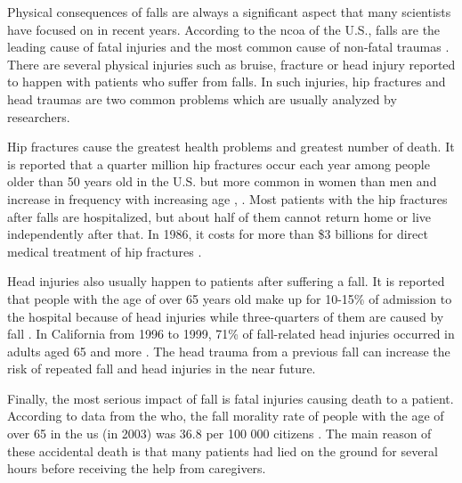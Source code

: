 \documentclass[letterpaper,12pt,titlepage,oneside,final]{book}
\begin{document}
Physical consequences of falls are always a significant aspect that many scientists have focused on in recent years. According to the \gls{ncoa} of the U.S., falls are the leading cause of fatal injuries and the most common cause of non-fatal traumas \cite{ncoa}. There are several physical injuries such as bruise, fracture or head injury reported to happen with patients who suffer from falls. In such injuries, hip fractures and head traumas are two common problems which are usually analyzed by researchers. \par
Hip fractures cause the greatest health problems and greatest number of death. It is reported that a quarter million hip fractures occur each year among people older than 50 years old in the U.S. but more common in women than men and increase in frequency with increasing age \cite{bibli_book}, \cite{medicinenet_fracture}. Most patients with the hip fractures after falls are hospitalized, but about half of them cannot return home or live independently after that. In 1986, it costs for more than \$3 billions for direct medical treatment of hip fractures \cite{medicinenet_fracture}.\par 

Head injuries also usually happen to patients after suffering a fall. It is reported that people with the age of over 65 years old make up for 10-15\% of admission to the hospital because of head injuries while three-quarters of them are caused by fall \cite{bibli_book}. In California from 1996 to 1999, 71\% of fall-related head injuries occurred in adults aged 65 and more \cite{head_injury_1}. The head trauma from a previous fall can increase the risk of repeated fall and head injuries in the near future.  \par

Finally, the most serious impact of fall is fatal injuries causing death to a patient. According to data from the \gls{who}, the fall morality rate of people with the age of over 65 in the \gls{us} (in 2003) was 36.8 per 100 000 citizens \cite{death_in_USA}. The main reason of these accidental death is that many patients had lied on the ground for several hours before receiving the help from caregivers. \par
\end{document}
